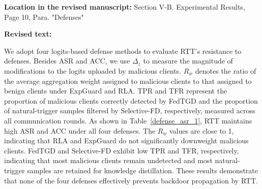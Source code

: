 \documentclass[11pt,a4paper]{article}
\newcommand{\manualindent}{\par\noindent\hspace*{1.5em}\ignorespaces}
\newcommand{\revisedtext}[2]{%
  {\bfseries\color{headingnavy}Location in the revised manuscript:} #1\par
  \begin{tcolorbox}[
      enhanced,breakable,colback=replyblue!3,colframe=replyblue!18,
      before upper={\setlength{\parskip}{6pt}},
      borderline west={2.5pt}{0pt}{replyblue},
      boxrule=0.5pt,arc=1mm,left=11pt,right=9pt,top=8pt,bottom=8pt]
    {\bfseries\color{headingnavy}Revised text:}\par
    #2
  \end{tcolorbox}
  \vspace{0.35em}%
}
\begin{document}
\revisedtext{Section V-B. Experimental Results, Page 10, Para. "Defenses"}{\manualindent We adopt four logits-based defense methods to evaluate RTT's resistance to defenses.
Besides ASR and ACC, we use $\Delta_z$ to measure the magnitude of modifications to the logits uploaded by malicious clients.
$R_w$ denotes the ratio of the average aggregation weight assigned to malicious clients to that assigned to benign clients under ExpGuard and RLA.
TPR and TFR represent the proportion of malicious clients correctly detected by FedTGD and the proportion of natural-trigger samples filtered by Selective-FD, respectively, measured across all communication rounds.
As shown in Table~\ref{defense_asr_1}, RTT maintains high ASR and ACC under all four defenses. 
The $R_w$ values are close to 1, indicating that RLA and ExpGuard do not significantly downweight malicious clients. 
FedTGD and Selective-FD exhibit low TPR and TFR, respectively, indicating that most malicious clients remain undetected and most natural-trigger samples are retained for knowledge distillation.
These results demonstrate that none of the four defenses effectively prevents backdoor propagation by RTT.

}
\end{document}
